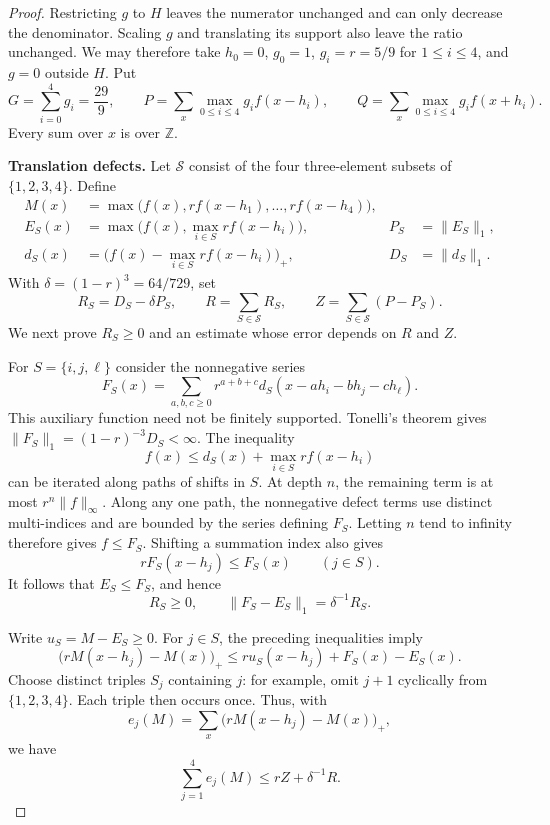\begin{proof}
Restricting $g$ to $H$ leaves the numerator unchanged and can only
decrease the denominator.  Scaling $g$ and translating its support
also leave the ratio unchanged.  We may therefore take $h_0=0$,
$g_0=1$, $g_i=r=5/9$ for $1\le i\le4$, and $g=0$ outside $H$.
Put
\[
 G=\sum_{i=0}^4g_i=\frac{29}{9},\qquad
 P=\sum_x\max_{0\le i\le4}g_i f(x-h_i),\qquad
 Q=\sum_x\max_{0\le i\le4}g_i f(x+h_i).
\]
Every sum over $x$ is over $\mathbb Z$.

\medskip\noindent\textbf{Translation defects.}
Let $\mathcal S$ consist of the four three-element subsets of
$\{1,2,3,4\}$.  Define
\[
 \begin{aligned}
 M(x)&=\max\bigl(f(x),r f(x-h_1),\ldots,r f(x-h_4)\bigr),\\
 E_S(x)&=\max\bigl(f(x),\max_{i\in S}r f(x-h_i)\bigr),&
 P_S&=\|E_S\|_1,\\
 d_S(x)&=\bigl(f(x)-\max_{i\in S}r f(x-h_i)\bigr)_+,&
 D_S&=\|d_S\|_1.
 \end{aligned}
\]
With $\delta=(1-r)^3=64/729$, set
\[
 R_S=D_S-\delta P_S,\qquad
 R=\sum_{S\in\mathcal S}R_S,\qquad
 Z=\sum_{S\in\mathcal S}(P-P_S).
\]
We next prove $R_S\ge0$ and an estimate whose error depends on $R$
and $Z$.

For $S=\{i,j,\ell\}$ consider the nonnegative series
\[
 F_S(x)=
 \sum_{a,b,c\ge0}r^{a+b+c}
 d_S(x-a h_i-b h_j-c h_\ell).
\]
This auxiliary function need not be finitely supported.  Tonelli's
theorem gives $\|F_S\|_1=(1-r)^{-3}D_S<\infty$.
The inequality
\[
 f(x)\le d_S(x)+\max_{i\in S}r f(x-h_i)
\]
can be iterated along paths of shifts in $S$.  At depth $n$, the
remaining term is at most $r^n\|f\|_\infty$.  Along any one path,
the nonnegative defect terms use distinct multi-indices and are
bounded by the series defining $F_S$.  Letting $n$ tend to infinity
therefore gives $f\le F_S$.  Shifting a summation index also gives
\[
 rF_S(x-h_j)\le F_S(x)\qquad(j\in S).
\]
It follows that $E_S\le F_S$, and hence
\begin{equation}\label{eq:five-profile-resolvent-excess}
 R_S\ge0,\qquad
 \|F_S-E_S\|_1=\delta^{-1}R_S.
\end{equation}

Write $u_S=M-E_S\ge0$.  For $j\in S$, the preceding inequalities imply
\[
 \bigl(rM(x-h_j)-M(x)\bigr)_+
 \le r u_S(x-h_j)+F_S(x)-E_S(x).
\]
Choose distinct triples $S_j$ containing $j$: for example, omit
$j+1$ cyclically from $\{1,2,3,4\}$.  Each triple then occurs once.
Thus, with
\[
 e_j(M)=\sum_x\bigl(rM(x-h_j)-M(x)\bigr)_+,
\]
we have
\begin{equation}\label{eq:five-profile-translation-error}
 \sum_{j=1}^4e_j(M)\le rZ+\delta^{-1}R.
\end{equation}


\end{proof}

